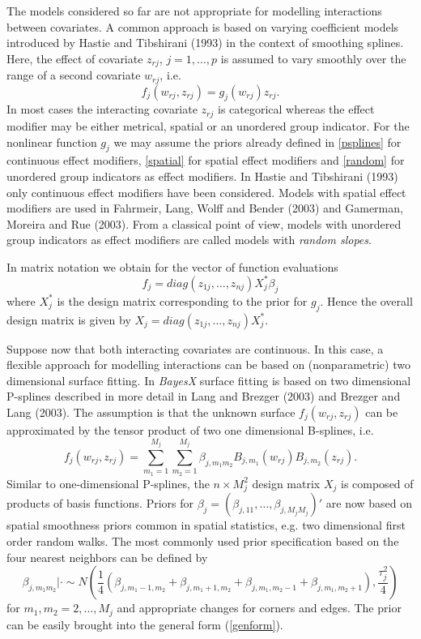 \documentclass[11pt,a4paper,twoside]{bayesxarticle}
\begin{document}
The models considered so far are not appropriate for modelling
interactions between covariates. A common approach is based on
varying coefficient models introduced by Hastie and Tibshirani
(1993) in the context of smoothing splines. Here, the effect of
covariate $z_{rj}$, $j=1,\dots,p$ is assumed to vary smoothly over
the range of a second covariate $w_{rj}$, i.e.
\begin{equation}
\label{varcoeffterm} f_j(w_{rj},z_{rj}) = g_j(w_{rj}) z_{rj}.
\end{equation}
In most cases the interacting covariate $z_{rj}$ is categorical
whereas the effect modifier may be either metrical, spatial or an
unordered group indicator. For the nonlinear function $g_j$ we may
assume the priors already defined in \autoref{psplines} for
continuous effect modifiers, \autoref{spatial} for spatial effect
modifiers and \autoref{random} for unordered group indicators as
effect modifiers. In Hastie and Tibshirani (1993) only continuous
effect modifiers have been considered. Models with spatial effect
modifiers are used in Fahrmeir, Lang, Wolff and Bender (2003) and
Gamerman, Moreira and Rue (2003). From a classical point of view,
models with unordered group indicators as effect modifiers are
called models with {\em random slopes}.

In matrix notation we obtain for the vector of function
evaluations
$$
f_j = diag(z_{1j},\dots,z_{nj})  X_j^* \beta_j
$$
where $X_j^*$ is the design matrix corresponding to the prior for
$g_j$. Hence the overall design matrix is given by $X_j =
diag(z_{1j},\dots,z_{nj})  X_j^*$.

Suppose now that both interacting covariates are continuous. In
this case, a flexible approach for modelling interactions can be
based on (nonparametric) two dimensional surface fitting. In {\em
BayesX} surface fitting is based on two dimensional P-splines
described in more detail in Lang and Brezger (2003) and Brezger
and Lang (2003). The assumption is that the unknown surface
$f_j(w_{rj},z_{rj})$ can be approximated by the tensor product of
two one dimensional B-splines, i.e.
$$
f_{j}(w_{rj},z_{rj}) = \sum_{m_1=1}^{M_j} \sum_{m_2=1}^{M_j}
\beta_{j,m_1 m_2} B_{j, m_1}(w_{rj}) B_{j,m_2} (z_{rj}).
$$
Similar to one-dimensional P-splines, the $n \times M_j^2$ design
matrix $X_j$ is composed of products of basis functions. Priors
for $\beta_{j} = (\beta_{j,11},\dots,\beta_{j,M_jM_j})'$ are now
based on spatial smoothness priors common in spatial statistics,
e.g. two dimensional first order random walks. The most commonly
used prior specification based on the four nearest neighbors can
be defined by
\begin{equation}
\label{2dimrw1} \beta_{j, m_1 m_2} | \cdot \sim N \left(
\frac{1}{4} ( \beta_{j, m_1-1,m_2}+ \beta_{j, m_1+1,m_2} +
\beta_{j, m_1,m_2-1} +\beta_{j, m_1,m_2+1}),\frac{\tau^2_{j}}{4}
\right)
\end{equation}
for $m_1,m_2=2,\dots,M_j$ and appropriate changes for corners and
edges. The prior can be easily brought into the general form
(\ref{genform}).
\end{document}
